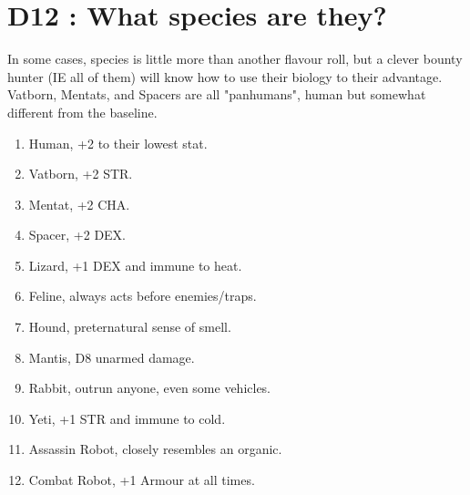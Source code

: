 \documentclass{article}
\begin{document}
\section*{D12 : What species are they?}
In some cases, species is little more than another flavour roll, but a clever bounty hunter (IE all of them) will know how to use their biology to their advantage. Vatborn, Mentats, and Spacers are all "panhumans", human but somewhat different from the baseline.
\begin{enumerate}
	\item Human, +2 to their lowest stat.
	\item Vatborn, +2 STR.
	\item Mentat, +2 CHA.
	\item Spacer, +2 DEX.
	\item Lizard, +1 DEX and immune to heat.
	\item Feline, always acts before enemies/traps.
	\item Hound, preternatural sense of smell.
	\item Mantis, D8 unarmed damage.
	\item Rabbit, outrun anyone, even some vehicles.
	\item Yeti, +1 STR and immune to cold.
	\item Assassin Robot, closely resembles an organic.
	\item Combat Robot, +1 Armour at all times.
\end{enumerate}
\end{document}

